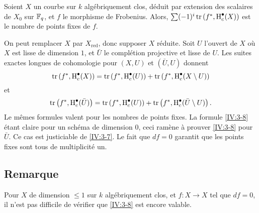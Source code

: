 \begin{corollary_}\label{IV:3-8}
Soient $X$ un courbe sur $k$ alg\'ebriquement clos, d\'eduit par extension des 
scalaires de $X_0$ sur $\mathbb{F}_q$, et $f$ le morphisme de Frobenius. Alors, 
$\sum (-1)^i \operatorname{tr}\left(f^\ast,\operatorname{H}_c^\bullet(X)\right)$ est le nombre de points 
fixes de $f$.
\end{corollary_}

On peut remplacer $X$ par $X_\text{red}$, donc supposer $X$ r\'eduite. Soit $U$ 
l'ouvert de $X$ o\`u $X$ est lisse de dimension $1$, et $\bar U$ le 
compl\'etion projective et lisse de $U$. Les suites exactes longues de 
cohomologie pour $(X,U)$ et $(\bar U,U)$ donnent 
\[
  \operatorname{tr}\left(f^\ast,\operatorname{H}_c^\bullet(X)\right) = \operatorname{tr}\left(f^\ast,\operatorname{H}_c^\bullet(U)\right) + \operatorname{tr}\left(f^\ast,\operatorname{H}_c^\bullet(X\setminus U)\right) 
\]
et
\[
  \operatorname{tr}\left(f^\ast,\operatorname{H}_c^\bullet(\bar U)\right) = \operatorname{tr}\left(f^\ast,\operatorname{H}_c^\bullet(U)\right) + \operatorname{tr}\left(f^\ast,\operatorname{H}_c^\bullet(\bar U\setminus U)\right) \text{.}
\]
Le m\^emes formules valent pour les nombres de points fixes. La formule 
\ref{IV:3-8} \'etant claire pour un sch\'ema de dimension $0$, ceci ram\`ene 
\`a prouver \ref{IV:3-8} pour $\bar U$. Ce cas est justiciable de \ref{IV:3-7}. 
Le fait que $d f=0$ garantit que les points fixes sont tous de 
multiplicit\'e un. 





\subsection{Remarque}\label{IV:3-9}

Pour $X$ de dimension $\leqslant 1$ sur $k$ alg\'ebriquement clos, et 
$f:X\to X$ tel que $d f=0$, il n'est pas difficile de v\'erifier que 
\ref{IV:3-8} est encore valable. 


